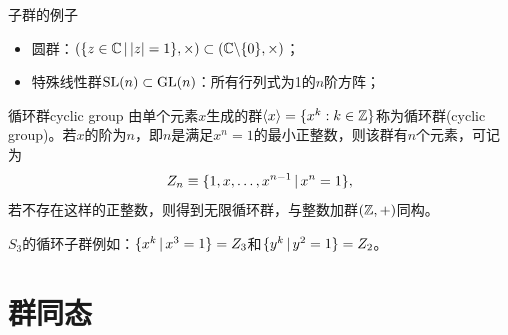 \begin{example}{子群的例子}{}
	\begin{itemize}
		\item 圆群：$(\{z \in \mathbb{C}\,\vert\,\lvert z\rvert = 1\}, \times) \subset (\mathbb{C}\backslash\{0\}, \times)$；
		\item 特殊线性群$\operatorname{SL}(n) \subset \operatorname{GL}(n)$：所有行列式为1的$n$阶方阵；
	\end{itemize}
\end{example}

\begin{definition}{循环群}{cyclic group}
	由单个元素$x$生成的群$\langle x\rangle = \{x^k:k \in \mathbb{Z}\}$称为循环群(cyclic group)。若$x$的阶为$n$，即$n$是满足$x^n = 1$的最小正整数，则该群有$n$个元素，可记为
	\begin{equation}
		Z_n \equiv \{1,x,\ldots,x^{n-1}\,\vert\,x^n = 1\},
	\end{equation}
	若不存在这样的正整数，则得到无限循环群，与整数加群$(\mathbb{Z},+)$同构。
\end{definition}
\begin{example}{}{}
	$S_3$的循环子群例如：$\{x^k\,\vert\,x^3 = 1\} = Z_3$和$\{y^k\,\vert\,y^2 = 1\} = Z_2$。
\end{example}

\section{群同态}

